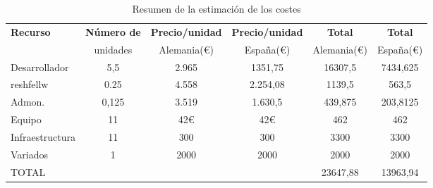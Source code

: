 \begin{center}
\begin {table}[H]
    \begin{tabular}{ |l|c|c|c|c|c|}
    \hline
    \textbf{Recurso} & \textbf{Número de } & \textbf{Precio/unidad } & \textbf{Precio/unidad } & \textbf{Total} & \textbf{Total} \\ 
      & unidades & Alemania(\euro{}) & España(\euro{}) & Alemania(\euro{}) & España(\euro{})\\ \hline
    Desarrollador & 5,5 & 2.965 & 1351,75 & 16307,5 & 7434,625 \\ \hline
    \gls{reshfellw} & 0.25 & 4.558 & 2.254,08 & 1139,5 & 563,5\\ \hline
    Admon. & 0,125 & 3.519 & 1.630,5 & 439,875 & 203,8125\\ \hline
    Equipo & 11 & 42\euro{} & 42\euro{} & 462 & 462 \\ \hline
    Infraestructura & 11 & 300 & 300 & 3300 & 3300 \\ \hline
    Variados & 1 & 2000 & 2000 & 2000& 2000 \\ \hline\hline
    TOTAL &&&& 23647,88 & 13963,94 \\ \hline
    \end{tabular}
    \caption{Resumen de la estimación de los costes}
    \label{table:resucost}
  \end{table}
\end{center}





\begin{comment}
\question{qué puedo poner? algo más?}
\todo[inline]{
Estudio y presupuesto de los costes de los recursos (humanos y materiales) descritos anteriormente, necesarios para el proyecto.

Para el cálculo de costes de personal pueden consultarse las tablas salariales de la UCA para el personal técnico de apoyo contratado laboral \cite{makebst}, o bien otras más ajustadas a la realidad. El cálculo del coste del personal del proyecto debe hacerse en personas-mes, y luego hacer la correspondencia al coste monetario.\\
}
\end{comment}
\section{}

